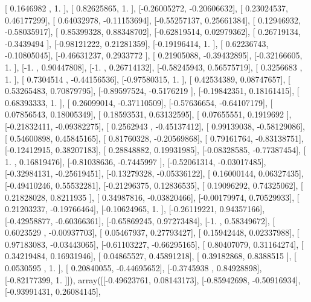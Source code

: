 \documentclass{article}
\begin{document}
       [ 0.1646982 ,  1.        ],
       [ 0.82625865,  1.        ],
       [-0.26005272, -0.20606632],
       [ 0.23024537,  0.46177299],
       [ 0.64032978, -0.11153694],
       [-0.55257137,  0.25661384],
       [ 0.12946932, -0.58035917],
       [ 0.85399328,  0.88348702],
       [-0.62819514,  0.02979362],
       [ 0.26719134, -0.3439494 ],
       [-0.98121222,  0.21281359],
       [-0.19196414,  1.        ],
       [ 0.62236743, -0.10805045],
       [-0.46631237,  0.2933772 ],
       [ 0.21905088, -0.39432895],
       [-0.32166605,  1.        ],
       [-1.        ,  0.90447808],
       [-1.        ,  0.26714132],
       [-0.58245943,  0.56575719],
       [ 0.3256683 ,  1.        ],
       [ 0.7304514 , -0.44156536],
       [-0.97580315,  1.        ],
       [ 0.42534389,  0.08747657],
       [ 0.53265483,  0.70879795],
       [-0.89597524, -0.5176219 ],
       [-0.19842351,  0.18161415],
       [ 0.68393333,  1.        ],
       [ 0.26099014, -0.37110509],
       [-0.57636654, -0.64107179],
       [ 0.07856543,  0.18005349],
       [ 0.18593531,  0.63132595],
       [ 0.07655551,  0.1919692 ],
       [-0.21832411, -0.09382275],
       [ 0.2562943 , -0.45137412],
       [ 0.99139038, -0.58129086],
       [ 0.54600898,  0.45845165],
       [ 0.81760328, -0.20569868],
       [ 0.79161764, -0.83138751],
       [-0.12412915,  0.38207183],
       [ 0.28848882,  0.19931985],
       [-0.08328585, -0.77387454],
       [ 1.        ,  0.16819476],
       [-0.81038636, -0.7445997 ],
       [-0.52061314, -0.03017485],
       [-0.32984131, -0.25619451],
       [-0.13279328, -0.05336122],
       [ 0.16000144,  0.06327435],
       [-0.49410246,  0.55532281],
       [-0.21296375,  0.12836535],
       [ 0.19096292,  0.74325062],
       [ 0.21828028,  0.8211935 ],
       [ 0.34987816, -0.03820466],
       [-0.00179974,  0.70529933],
       [ 0.21203237, -0.19766464],
       [-0.10624965,  1.        ],
       [-0.26119221,  0.94357166],
       [-0.42958877, -0.60366361],
       [-0.65869245,  0.97273484],
       [-1.        ,  0.58349672],
       [ 0.6023529 , -0.00937703],
       [ 0.05467937,  0.27793427],
       [ 0.15942448,  0.02337988],
       [ 0.97183083, -0.03443065],
       [-0.61103227, -0.66295165],
       [ 0.80407079,  0.31164274],
       [ 0.34219484,  0.16931946],
       [ 0.04865527,  0.45891218],
       [ 0.39182868,  0.8388515 ],
       [ 0.0530595 ,  1.        ],
       [ 0.20840055, -0.44695652],
       [-0.3745938 ,  0.84928898],
       [-0.82177399,  1.        ]]), array([[-0.49623761,  0.08143173],
       [-0.85942698, -0.50916934],
       [-0.93991431,  0.26084145],
\end{document}
